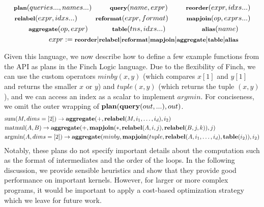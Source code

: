 \begin{align*}
    \footnotesize \text{\textbf{plan}}(queries..., names...) \quad\quad\quad \text{\textbf{query}}(name, expr) \quad\quad\quad \text{\textbf{reorder}}(expr, idxs...)\\
     \footnotesize \text{\textbf{relabel}}(expr, idxs...) \quad\quad\quad \text{\textbf{reformat}}(expr, format) \quad\quad\quad \text{\textbf{mapjoin}}(op, exprs...) \\
    \footnotesize\text{\textbf{aggregate}}(op, expr)\quad\quad\quad\quad \text{\textbf{table}}(tns, idxs...)  \quad\quad\quad\quad\quad\quad \text{\textbf{alias}}(name) \quad\quad\\
     \footnotesize expr:= \text{\textbf{reorder}} | \text{\textbf{relabel}} | \text{\textbf{reformat}} |\text{\textbf{mapjoin}} | \text{\textbf{aggregate}} | \text{\textbf{table}} | \text{\textbf{alias}} \quad\quad
\end{align*}

Given this language, we now describe how to define a few example functions from the API as plans in the Finch Logic language. Due to the flexibility of Finch, we can use the custom operators $minby(x,y)$ (which compares $x[1]$ and $y[1]$ and returns the smaller $x$ or $y$) and $tuple(x, y)$ (which returns the tuple $(x,y)$), and we can access an index as a scalar to implement $argmin$. For conciseness, we omit the outer wrapping of $\text{\textbf{plan}}(\text{\textbf{query}}(out,...),out)$.
\begin{align*}
\footnotesize &\text{sum}(M, dims=[2]) \rightarrow \text{\textbf{aggregate}}(+,\text{\textbf{relabel}}(M, i_1,\ldots,i_d), i_2)\\
\footnotesize &\text{matmul}(A, B) \rightarrow \text{\textbf{aggregate}}(+,\text{\textbf{mapjoin}}(*, \text{\textbf{relabel}}(A, i, j), \text{\textbf{relabel}}(B, j, k)), j)\\
\footnotesize &\text{argmin}(A, dims=[2]) \rightarrow \text{\textbf{aggregate}}(minby,\text{\textbf{mapjoin}}(tuple, \text{\textbf{relabel}}(A, i_1,\ldots,i_d), \text{\textbf{table}}(i_2)), i_2)
\end{align*}
Notably, these plans do not specify important details about the computation such as the format of intermediates and the order of the loops. In the following discussion, we provide sensible heuristics and show that they provide good performance on important kernels. However, for larger or more complex programs, it would be important to apply a cost-based optimization strategy which we leave for future work.


